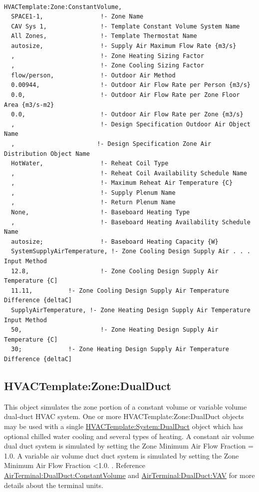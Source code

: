 \begin{lstlisting}

HVACTemplate:Zone:ConstantVolume,
  SPACE1-1,                !- Zone Name
  CAV Sys 1,               !- Template Constant Volume System Name
  All Zones,               !- Template Thermostat Name
  autosize,                !- Supply Air Maximum Flow Rate {m3/s}
  ,                        !- Zone Heating Sizing Factor
  ,                        !- Zone Cooling Sizing Factor
  flow/person,             !- Outdoor Air Method
  0.00944,                 !- Outdoor Air Flow Rate per Person {m3/s}
  0.0,                     !- Outdoor Air Flow Rate per Zone Floor Area {m3/s-m2}
  0.0,                     !- Outdoor Air Flow Rate per Zone {m3/s}
  ,                        !- Design Specification Outdoor Air Object Name
  ,                       !- Design Specification Zone Air Distribution Object Name
  HotWater,                !- Reheat Coil Type
  ,                        !- Reheat Coil Availability Schedule Name
  ,                        !- Maximum Reheat Air Temperature {C}
  ,                        !- Supply Plenum Name
  ,                        !- Return Plenum Name
  None,                    !- Baseboard Heating Type
  ,                        !- Baseboard Heating Availability Schedule Name
  autosize;                !- Baseboard Heating Capacity {W}
  SystemSupplyAirTemperature, !- Zone Cooling Design Supply Air . . . Input Method
  12.8,                    !- Zone Cooling Design Supply Air Temperature {C]
  11.11,          !- Zone Cooling Design Supply Air Temperature Difference {deltaC]
  SupplyAirTemperature, !- Zone Heating Design Supply Air Temperature Input Method
  50,                      !- Zone Heating Design Supply Air Temperature {C]
  30;             !- Zone Heating Design Supply Air Temperature Difference {deltaC]
\end{lstlisting}

\subsection{HVACTemplate:Zone:DualDuct}\label{hvactemplatezonedualduct}

This object simulates the zone portion of a constant volume or variable volume dual-duct HVAC system. One or more HVACTemplate:Zone:DualDuct objects may be used with a single \hyperref[hvactemplatesystemdualduct]{HVACTemplate:System:DualDuct} object which has optional chilled water cooling and several types of heating. A constant air volume dual duct system is simulated by setting the Zone Minimum Air Flow Fraction = 1.0. A variable air volume duct duct system is simulated by setting the Zone Minimum Air Flow Fraction \textless{}1.0. . Reference \hyperref[airterminaldualductconstantvolume]{AirTerminal:DualDuct:ConstantVolume} and \hyperref[airterminaldualductvav]{AirTerminal:DualDuct:VAV} for more details about the terminal units.

